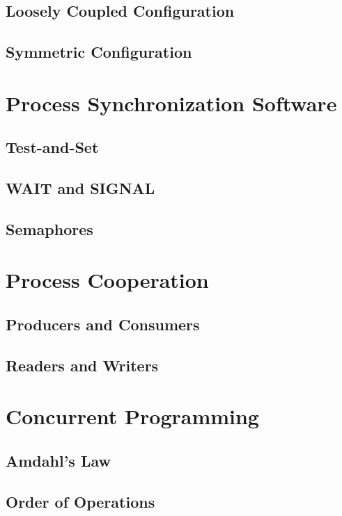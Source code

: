 \documentclass[12pt letter]{report}
\begin{document}
\subsection{Loosely Coupled Configuration}

\subsection{Symmetric Configuration}

\section{Process Synchronization Software}

\subsection{Test-and-Set}

\subsection{WAIT and SIGNAL}

\subsection{Semaphores}

\section{Process Cooperation}

\subsection{Producers and Consumers}

\subsection{Readers and Writers}

\section{Concurrent Programming}

\subsection{Amdahl's Law}

\subsection{Order of Operations}
\end{document}
